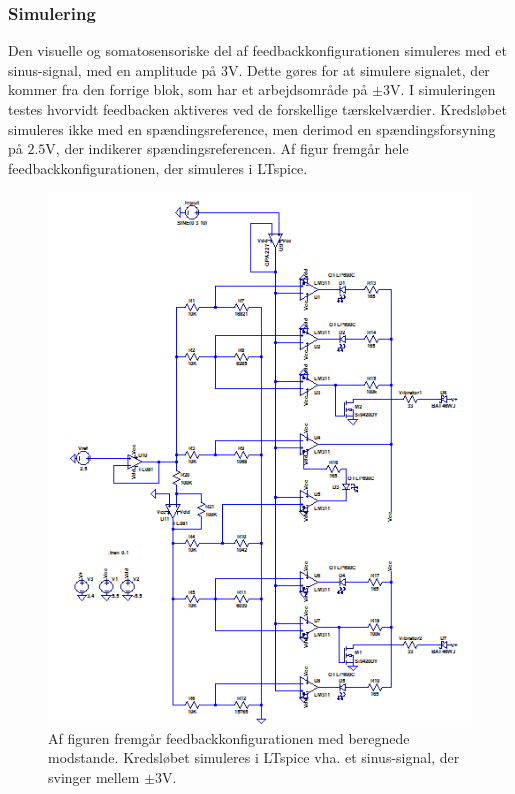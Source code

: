 \subsubsection{Simulering}\label{feedback_simulering}
Den visuelle og somatosensoriske del af feedbackkonfigurationen simuleres med et sinus-signal, med en amplitude på $3$V. Dette gøres for at simulere signalet, der kommer fra den forrige blok, som har et arbejdsområde på $\pm3$V. I simuleringen testes hvorvidt feedbacken aktiveres ved de forskellige tærskelværdier.
Kredsløbet simuleres ikke med en spændingsreference, men derimod en spændingsforsyning på $2.5$V, der indikerer spændingsreferencen. Af figur  fremgår hele feedbackkonfigurationen, der simuleres i LTspice.

\begin{figure}[H]
	\centering
	\includegraphics[scale=0.9]{figures/cProblemloesning/komparator_samlet.PNG}
	\caption{Af figuren fremgår feedbackkonfigurationen med beregnede modstande. Kredsløbet simuleres i LTspice vha. et sinus-signal, der svinger mellem $\pm3$V.}
	\label{fig:komparator_samlet}
\end{figure}
 
